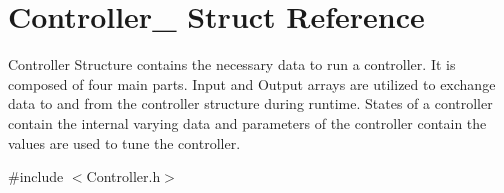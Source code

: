 \hypertarget{struct_controller__}{}\section{Controller\+\_\+ Struct Reference}
\label{struct_controller__}


Controller Structure contains the necessary data to run a controller. It is composed of four main parts. Input and Output arrays are utilized to exchange data to and from the controller structure during runtime. States of a controller contain the internal varying data and parameters of the controller contain the values are used to tune the controller.  




{\ttfamily \#include $<$Controller.\+h$>$}


